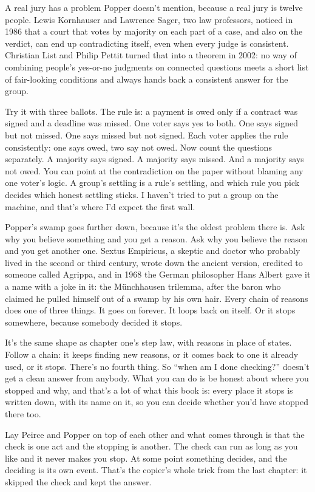 \documentclass[11pt,twoside]{article}
\theoremstyle{thielethm}
\theoremstyle{thieledef}
\theoremstyle{thieledef}
\theoremstyle{thieledef}
\theoremstyle{thielethm}
\theoremstyle{thieleobs}
\theoremstyle{thielethm}
\begin{document}
A real jury has a problem Popper doesn't mention, because a real jury is twelve people. Lewis Kornhauser and Lawrence Sager, two law professors, noticed in 1986 that a court that votes by majority on each part of a case, and also on the verdict, can end up contradicting itself, even when every judge is consistent. Christian List and Philip Pettit turned that into a theorem in 2002: no way of combining people's yes-or-no judgments on connected questions meets a short list of fair-looking conditions and always hands back a consistent answer for the group.

Try it with three ballots. The rule is: a payment is owed only if a contract was signed and a deadline was missed. One voter says yes to both. One says signed but not missed. One says missed but not signed. Each voter applies the rule consistently: one says owed, two say not owed. Now count the questions separately. A majority says signed. A majority says missed. And a majority says not owed. You can point at the contradiction on the paper without blaming any one voter's logic. A group's settling is a rule's settling, and which rule you pick decides which honest settling sticks. I haven't tried to put a group on the machine, and that's where I'd expect the first wall.

Popper's swamp goes further down, because it's the oldest problem there is. Ask why you believe something and you get a reason. Ask why you believe the reason and you get another one. Sextus Empiricus, a skeptic and doctor who probably lived in the second or third century, wrote down the ancient version, credited to someone called Agrippa, and in 1968 the German philosopher Hans Albert gave it a name with a joke in it: the Münchhausen trilemma, after the baron who claimed he pulled himself out of a swamp by his own hair. Every chain of reasons does one of three things. It goes on forever. It loops back on itself. Or it stops somewhere, because somebody decided it stops.

It's the same shape as chapter one's step law, with reasons in place of states. Follow a chain: it keeps finding new reasons, or it comes back to one it already used, or it stops. There's no fourth thing. So ``when am I done checking?'' doesn't get a clean answer from anybody. What you can do is be honest about where you stopped and why, and that's a lot of what this book is: every place it stops is written down, with its name on it, so you can decide whether you'd have stopped there too.

Lay Peirce and Popper on top of each other and what comes through is that the check is one act and the stopping is another. The check can run as long as you like and it never makes you stop. At some point something decides, and the deciding is its own event. That's the copier's whole trick from the last chapter: it skipped the check and kept the answer.
\end{document}
